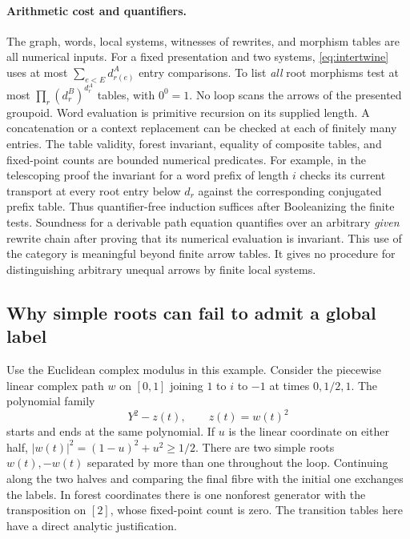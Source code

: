 \paragraph{Arithmetic cost and quantifiers.}
The graph, words, local systems, witnesses of rewrites, and morphism tables are all numerical inputs. For a fixed presentation and two systems, \eqref{eq:intertwine} uses at most $\sum_{e<E}d_{r(e)}^A$ entry comparisons. To list \emph{all} root morphisms test at most $\prod_r(d_r^B)^{d_r^A}$ tables, with $0^0=1$. No loop scans the arrows of the presented groupoid. Word evaluation is primitive recursion on its supplied length. A concatenation or a context replacement can be checked at each of finitely many entries. The table validity, forest invariant, equality of composite tables, and fixed-point counts are bounded numerical predicates. For example, in the telescoping proof the invariant for a word prefix of length $i$ checks its current transport at every root entry below $d_r$ against the corresponding conjugated prefix table. Thus quantifier-free induction suffices after Booleanizing the finite tests. Soundness for a derivable path equation quantifies over an arbitrary \emph{given} rewrite chain after proving that its numerical evaluation is invariant. This use of the category is meaningful beyond finite arrow tables. It gives no procedure for distinguishing arbitrary unequal arrows by finite local systems.

\subsection{Why simple roots can fail to admit a global label}
Use the Euclidean complex modulus in this example. Consider the piecewise linear complex path $w$ on $[0,1]$ joining $1$ to $i$ to $-1$ at times $0,1/2,1$. The polynomial family
\[
                          Y^2-z(t),\qquad z(t)=w(t)^2
\]
starts and ends at the same polynomial. If $u$ is the linear coordinate on either half, $|w(t)|^2=(1-u)^2+u^2\ge1/2$. There are two simple roots $w(t),-w(t)$ separated by more than one throughout the loop. Continuing along the two halves and comparing the final fibre with the initial one exchanges the labels. In forest coordinates there is one nonforest generator with the transposition on $[2]$, whose fixed-point count is zero. The transition tables here have a direct analytic justification.

